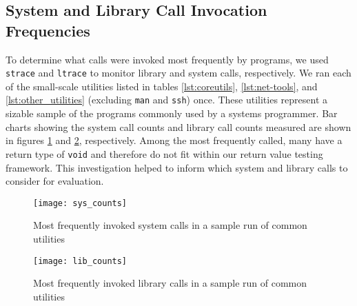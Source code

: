 \subsection{System and Library Call Invocation Frequencies}
To determine what calls were invoked most frequently by programs, we used \texttt{strace} and \texttt{ltrace} to monitor library and system calls, respectively. We ran each of the small-scale utilities listed in tables \ref{lst:coreutils}, \ref{lst:net-tools}, and \ref{lst:other_utilities} (excluding \texttt{man} and \texttt{ssh}) once. These utilities represent a sizable sample of the programs commonly used by a systems programmer. Bar charts showing the system call counts and library call counts measured are shown in figures \ref{fig:sys_counts} and \ref{fig:lib_counts}, respectively. Among the most frequently called, many have a return type of \texttt{void} and therefore do not fit within our return value testing framework. This investigation helped to inform which system and library calls to consider for evaluation.\\
\begin{figure}
\centering
\texttt{[image: sys\_counts]}
\caption{Most frequently invoked system calls in a sample run of common utilities}
\label{fig:sys_counts}
\end{figure}

\begin{figure}
\centering
\texttt{[image: lib\_counts]}
\caption{Most frequently invoked library calls in a sample run of common utilities}
\label{fig:lib_counts}
\end{figure}
